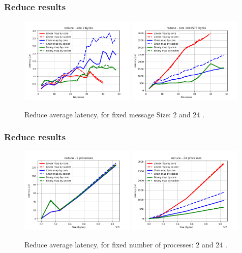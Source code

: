 \documentclass{beamer}
\begin{document}
\begin{frame}
    \frametitle{Reduce results}
    
    \begin{figure}
        \centering
        \includegraphics[width=0.49\textwidth]{../plots/reduce_fixedSize2.png}
        \includegraphics[width=0.49\textwidth]{../plots/reduce_fixedSize1048576.png}
        \caption{Reduce average latency, for fixed message Size: 2 and 24 .}
    \end{figure}
    
\end{frame}


\begin{frame}
    \frametitle{Reduce results}
    
    \begin{figure}
        \centering
        \includegraphics[width=0.49\textwidth]{../plots/reduce_fixedprocesses2.png}
        \includegraphics[width=0.49\textwidth]{../plots/reduce_fixedprocesses24.png}
        \caption{Reduce average latency, for fixed number of processes: 2 and 24 .}
    \end{figure}
    
\end{frame}
\end{document}
